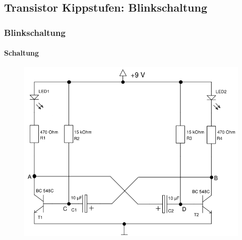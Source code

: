 \subsection{Transistor Kippstufen: Blinkschaltung} %
\label{sub:Transistor_Kippstufen:_Blinkschaltung}
\begin{frame}
    \frametitle{Blinkschaltung}
    \framesubtitle{Schaltung}
    \begin{figure}[H]
    \begin{center}
            \includegraphics[scale=0.37]{./img/schaltungen/blink_0.png}
    \end{center}
    \end{figure}
\end{frame}

